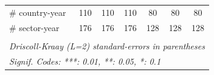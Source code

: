 \documentclass[a4paper]{article}
\begin{document}
\begin{table}[h!]
\begin{tabular}{lcccccc}
     \# country-year           & 110                   & 110                    & 110                    & 80                     & 80                     & 80\\  
      \# sector-year            & 176                   & 176                    & 176                    & 128                    & 128                    & 128\\  
      \bottomrule \\ [-0.9em]
      \multicolumn{7}{l}{\emph{Driscoll-Kraay (L=2) standard-errors in parentheses}}\\
      \multicolumn{7}{l}{\emph{Signif. Codes: ***: 0.01, **: 0.05, *: 0.1}}\\
   \end{tabular}
   \end{table}
\FloatBarrier
\end{document}
